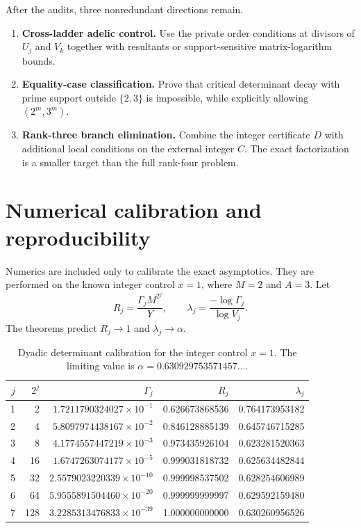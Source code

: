 \documentclass[11pt]{article}
\theoremstyle{definition}
\begin{document}
After the audits, three nonredundant directions remain.

\begin{enumerate}
\item \textbf{Cross-ladder adelic control.}  Use the private order conditions at divisors
of $U_j$ and $V_k$ together with resultants or support-sensitive matrix-logarithm bounds.

\item \textbf{Equality-case classification.}  Prove that critical determinant decay with
prime support outside $\{2,3\}$ is impossible, while explicitly allowing
$(2^m,3^m)$.

\item \textbf{Rank-three branch elimination.}  Combine the integer certificate $D$ with
additional local conditions on the external integer $C$.  The exact factorization is a
smaller target than the full rank-four problem.
\end{enumerate}

\section{Numerical calibration and reproducibility}\label{sec:numerics}

Numerics are included only to calibrate the exact asymptotics.  They are performed on the
known integer control $x=1$, where $M=2$ and $A=3$.  Let
\begin{equation}\label{eq:numerical-ratios}
 R_j=\frac{\Gamma_jM^{2^j}}{Y},
 \qquad
 \lambda_j=\frac{-\log\Gamma_j}{\log V_j}.
\end{equation}
The theorems predict $R_j\to1$ and $\lambda_j\to\alpha$.

\begin{table}[htbp]
\centering
\small
\begin{tabular}{@{}rrrrr@{}}
\toprule
$j$ & $2^j$ & $\Gamma_j$ & $R_j$ & $\lambda_j$ \\
\midrule
1 & 2   & $1.7211790324027\times10^{-1}$ & 0.626673868536 & 0.764173953182 \\
2 & 4   & $5.8097974438167\times10^{-2}$ & 0.846128885139 & 0.645746715285 \\
3 & 8   & $4.1774557447219\times10^{-3}$ & 0.973435926104 & 0.623281520363 \\
4 & 16  & $1.6747263074177\times10^{-5}$ & 0.999031818732 & 0.625634482844 \\
5 & 32  & $2.5579023220339\times10^{-10}$& 0.999998537502 & 0.628254606989 \\
6 & 64  & $5.9555891504460\times10^{-20}$& 0.999999999997 & 0.629592159480 \\
7 & 128 & $3.2285313476833\times10^{-39}$& 1.000000000000 & 0.630260956526 \\
\bottomrule
\end{tabular}
\caption{Dyadic determinant calibration for the integer control $x=1$.  The limiting
value is $\alpha=0.630929753571457\ldots$.}
\label{tab:numerical}
\end{table}
\end{document}

